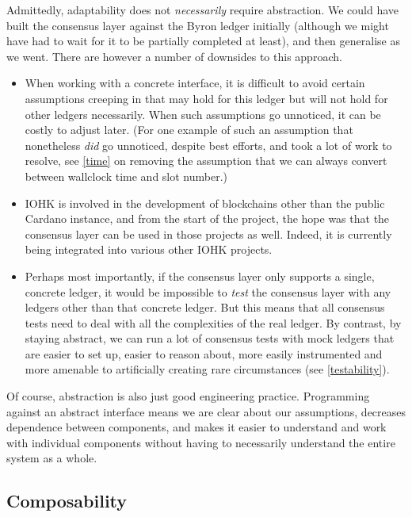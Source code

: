 Admittedly, adaptability does not \emph{necessarily} require abstraction. We
could have built the consensus layer against the Byron ledger initially
(although we might have had to wait for it to be partially completed at least),
and then generalise as we went. There are however a number of downsides to this
approach.

\begin{itemize}
\item When working with a concrete interface, it is difficult to avoid certain
assumptions creeping in that may hold for this ledger but will not hold for
other ledgers necessarily. When such assumptions go unnoticed, it can be costly
to adjust later. (For one example of such an assumption that nonetheless
\emph{did} go unnoticed, despite best efforts, and took a lot of work to
resolve, see \cref{time} on removing the assumption that we can always
convert between wallclock time and slot number.)

\item IOHK is involved in the development of blockchains other than the public
Cardano instance, and from the start of the project, the hope was that the
consensus layer can be used in those projects as well. Indeed, it is currently
being integrated into various other IOHK projects.

\item Perhaps most importantly, if the consensus layer only supports a single,
concrete ledger, it would be impossible to \emph{test} the consensus layer with
any ledgers other than that concrete ledger. But this means that all consensus
tests need to deal with all the complexities of the real ledger. By contrast,
by staying abstract, we can run a lot of consensus tests with mock ledgers that
are easier to set up, easier to reason about, more easily instrumented and more
amenable to artificially creating rare circumstances (see \cref{testability}).
\end{itemize}

Of course, abstraction is also just good engineering practice. Programming
against an abstract interface means we are clear about our assumptions,
decreases dependence between components, and makes it easier to understand and
work with individual components without having to necessarily understand the
entire system as a whole.

\subsection{Composability}
\label{composability}

